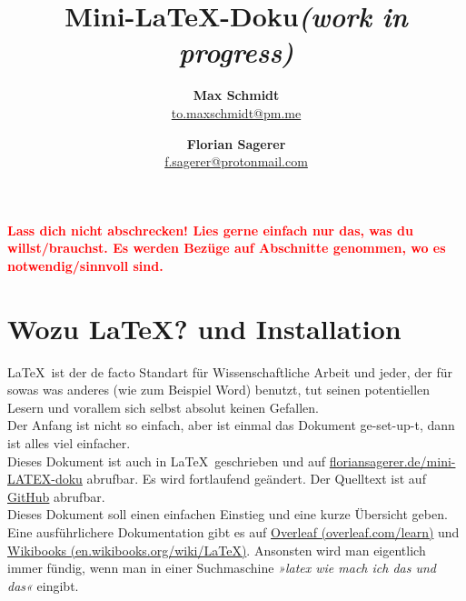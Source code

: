 \documentclass[titlepage]{article}
\begin{document}
\title{\Huge\textbf{Mini-\LaTeX-Doku}\Large \textit{(work in progress)}}
\author{\textbf{Max Schmidt} \\ \href{mailto:to.maxschmidt@pm.me}{to.maxschmidt@pm.me}
	\and \textbf{Florian Sagerer} \\ \href{mailto:f.sagerer@protonmail.com}{f.sagerer@protonmail.com} }


\maketitle
\thispagestyle{empty}

\newpage
\thispagestyle{empty}
\tableofcontents

\newpage
\begin{center}
	{\setlength{\parindent}{0cm}
		\large{\textcolor{red}{\textbf{Lass dich nicht abschrecken! Lies gerne einfach nur das, was du willst/brauchst. Es werden Bezüge auf Abschnitte genommen, wo es notwendig/sinnvoll sind.}}}
	}
\end{center}





\setcounter{page}{3}

\section{Wozu \LaTeX? und Installation}



\LaTeX\ ist der de facto Standart für Wissenschaftliche Arbeit und jeder, der für sowas was anderes (wie zum Beispiel Word) benutzt, tut seinen potentiellen Lesern und vorallem sich selbst absolut keinen Gefallen. \\
Der Anfang ist nicht so einfach, aber ist einmal das Dokument ge-set-up-t, dann ist alles viel einfacher. \\

Dieses Dokument ist auch in \LaTeX\ geschrieben und auf \href{https://floriansagerer.de/mini-LATEX-doku/}{floriansagerer.de/mini-LATEX-doku} abrufbar.
Es wird fortlaufend geändert.
Der Quelltext ist auf \href{https://github.com/maxschm1dt/mini-LATEX-doku}{GitHub} abrufbar.\\

Dieses Dokument soll einen einfachen Einstieg und eine kurze Übersicht geben.
Eine ausführlichere Dokumentation gibt es auf \href{https://www.overleaf.com/learn}{Overleaf (overleaf.com/learn)} und \href{https://en.wikibooks.org/wiki/LaTeX}{Wikibooks (en.wikibooks.org/wiki/LaTeX)}. Ansonsten wird man eigentlich immer fündig, wenn man in einer Suchmaschine \textit{»latex wie mach ich das und das«} eingibt.
\end{document}
